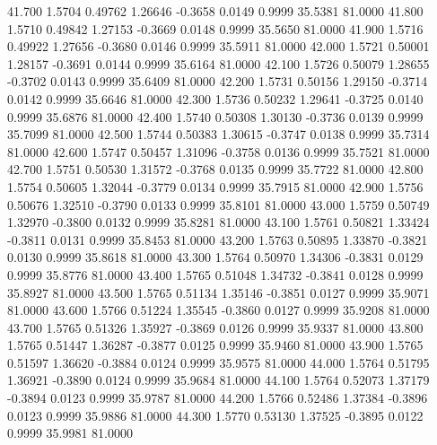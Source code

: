   41.700   1.5704   0.49762   1.26646  -0.3658   0.0149   0.9999  35.5381  81.0000
  41.800   1.5710   0.49842   1.27153  -0.3669   0.0148   0.9999  35.5650  81.0000
  41.900   1.5716   0.49922   1.27656  -0.3680   0.0146   0.9999  35.5911  81.0000
  42.000   1.5721   0.50001   1.28157  -0.3691   0.0144   0.9999  35.6164  81.0000
  42.100   1.5726   0.50079   1.28655  -0.3702   0.0143   0.9999  35.6409  81.0000
  42.200   1.5731   0.50156   1.29150  -0.3714   0.0142   0.9999  35.6646  81.0000
  42.300   1.5736   0.50232   1.29641  -0.3725   0.0140   0.9999  35.6876  81.0000
  42.400   1.5740   0.50308   1.30130  -0.3736   0.0139   0.9999  35.7099  81.0000
  42.500   1.5744   0.50383   1.30615  -0.3747   0.0138   0.9999  35.7314  81.0000
  42.600   1.5747   0.50457   1.31096  -0.3758   0.0136   0.9999  35.7521  81.0000
  42.700   1.5751   0.50530   1.31572  -0.3768   0.0135   0.9999  35.7722  81.0000
  42.800   1.5754   0.50605   1.32044  -0.3779   0.0134   0.9999  35.7915  81.0000
  42.900   1.5756   0.50676   1.32510  -0.3790   0.0133   0.9999  35.8101  81.0000
  43.000   1.5759   0.50749   1.32970  -0.3800   0.0132   0.9999  35.8281  81.0000
  43.100   1.5761   0.50821   1.33424  -0.3811   0.0131   0.9999  35.8453  81.0000
  43.200   1.5763   0.50895   1.33870  -0.3821   0.0130   0.9999  35.8618  81.0000
  43.300   1.5764   0.50970   1.34306  -0.3831   0.0129   0.9999  35.8776  81.0000
  43.400   1.5765   0.51048   1.34732  -0.3841   0.0128   0.9999  35.8927  81.0000
  43.500   1.5765   0.51134   1.35146  -0.3851   0.0127   0.9999  35.9071  81.0000
  43.600   1.5766   0.51224   1.35545  -0.3860   0.0127   0.9999  35.9208  81.0000
  43.700   1.5765   0.51326   1.35927  -0.3869   0.0126   0.9999  35.9337  81.0000
  43.800   1.5765   0.51447   1.36287  -0.3877   0.0125   0.9999  35.9460  81.0000
  43.900   1.5765   0.51597   1.36620  -0.3884   0.0124   0.9999  35.9575  81.0000
  44.000   1.5764   0.51795   1.36921  -0.3890   0.0124   0.9999  35.9684  81.0000
  44.100   1.5764   0.52073   1.37179  -0.3894   0.0123   0.9999  35.9787  81.0000
  44.200   1.5766   0.52486   1.37384  -0.3896   0.0123   0.9999  35.9886  81.0000
  44.300   1.5770   0.53130   1.37525  -0.3895   0.0122   0.9999  35.9981  81.0000
